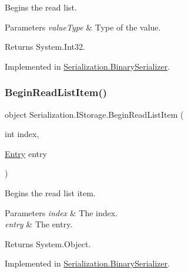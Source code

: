Begins the read list. 


\begin{DoxyParams}{Parameters}
{\em value\+Type} & Type of the value.\\
\hline
\end{DoxyParams}
\begin{DoxyReturn}{Returns}
System.\+Int32.
\end{DoxyReturn}


Implemented in \hyperlink{class_serialization_1_1_binary_serializer_ace00f8cacc0ff79bb16197d641964e4c}{Serialization.\+Binary\+Serializer}.

\mbox{\label{interface_serialization_1_1_i_storage_abfe338de53a6322dbd3832d426ae49a4}} 
\subsubsection{\texorpdfstring{Begin\+Read\+List\+Item()}{BeginReadListItem()}}
{\footnotesize\ttfamily object Serialization.\+I\+Storage.\+Begin\+Read\+List\+Item (\begin{DoxyParamCaption}\item[{int}]{index,  }\item[{\hyperlink{class_serialization_1_1_entry}{Entry}}]{entry }\end{DoxyParamCaption})}



Begins the read list item. 


\begin{DoxyParams}{Parameters}
{\em index} & The index.\\
\hline
{\em entry} & The entry.\\
\hline
\end{DoxyParams}
\begin{DoxyReturn}{Returns}
System.\+Object.
\end{DoxyReturn}


Implemented in \hyperlink{class_serialization_1_1_binary_serializer_a8d689325716bdb8c393e16414fefd59f}{Serialization.\+Binary\+Serializer}.

\mbox{\label{interface_serialization_1_1_i_storage_a27e63deec5c78fd5013d1d3b7607e04c}} 
